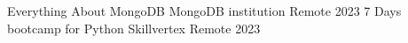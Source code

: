 
\begin{cvhonors}

  \cvhonor
    {Everything About MongoDB} %
    {MongoDB institution} %
    {Remote} %
    {2023} %
  \cvhonor
    {7 Days bootcamp for Python} %
    {Skillvertex} %
    {Remote} %
    {2023} %
\end{cvhonors}
